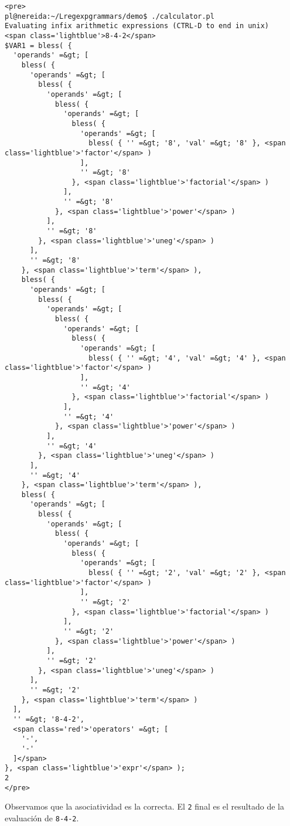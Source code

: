 \begin{verbatim}
<pre>
pl@nereida:~/Lregexpgrammars/demo$ ./calculator.pl
Evaluating infix arithmetic expressions (CTRL-D to end in unix)
<span class='lightblue'>8-4-2</span>
$VAR1 = bless( {
  'operands' =&gt; [
    bless( {
      'operands' =&gt; [
        bless( {
          'operands' =&gt; [
            bless( {
              'operands' =&gt; [
                bless( {
                  'operands' =&gt; [
                    bless( { '' =&gt; '8', 'val' =&gt; '8' }, <span class='lightblue'>'factor'</span> )
                  ],
                  '' =&gt; '8'
                }, <span class='lightblue'>'factorial'</span> )
              ],
              '' =&gt; '8'
            }, <span class='lightblue'>'power'</span> )
          ],
          '' =&gt; '8'
        }, <span class='lightblue'>'uneg'</span> )
      ],
      '' =&gt; '8'
    }, <span class='lightblue'>'term'</span> ),
    bless( {
      'operands' =&gt; [
        bless( {
          'operands' =&gt; [
            bless( {
              'operands' =&gt; [
                bless( {
                  'operands' =&gt; [
                    bless( { '' =&gt; '4', 'val' =&gt; '4' }, <span class='lightblue'>'factor'</span> )
                  ],
                  '' =&gt; '4'
                }, <span class='lightblue'>'factorial'</span> )
              ],
              '' =&gt; '4'
            }, <span class='lightblue'>'power'</span> )
          ],
          '' =&gt; '4'
        }, <span class='lightblue'>'uneg'</span> )
      ],
      '' =&gt; '4'
    }, <span class='lightblue'>'term'</span> ),
    bless( {
      'operands' =&gt; [
        bless( {
          'operands' =&gt; [
            bless( {
              'operands' =&gt; [
                bless( {
                  'operands' =&gt; [
                    bless( { '' =&gt; '2', 'val' =&gt; '2' }, <span class='lightblue'>'factor'</span> )
                  ],
                  '' =&gt; '2'
                }, <span class='lightblue'>'factorial'</span> )
              ],
              '' =&gt; '2'
            }, <span class='lightblue'>'power'</span> )
          ],
          '' =&gt; '2'
        }, <span class='lightblue'>'uneg'</span> )
      ],
      '' =&gt; '2'
    }, <span class='lightblue'>'term'</span> )
  ],
  '' =&gt; '8-4-2',
  <span class='red'>'operators' =&gt; [
    '-',
    '-'
  ]</span>
}, <span class='lightblue'>'expr'</span> );
2
</pre>
\end{verbatim}
Observamos que la asociatividad es la correcta.
El \verb|2| final es el resultado de la evaluación de
\verb|8-4-2|.

